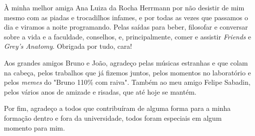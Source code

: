 À minha melhor amiga Ana Luiza da Rocha Herrmann por não desistir de mim mesmo com as piadas e trocadilhos infames, e por todas as vezes que passamos o dia e viramos a noite programando. Pelas saídas para beber, filosofar e conversar sobre a vida e a faculdade, conselhos, e, principalmente, comer e assistir \textit{Friends} e \textit{Grey's Anatomy}. Obrigada por tudo, cara!

Aos grandes amigos Bruno e João, agradeço pelas músicas estranhas e que colam na cabeça, pelos trabalhos que já fizemos juntos, pelos momentos no laboratório e pelos \textit{memes} do "Bruno 110\% com raiva". Também ao meu amigo Felipe Sabadin, pelos vários anos de amizade e risadas, que até hoje se mantém.

Por fim, agradeço a todos que contribuíram de alguma forma para a minha formação dentro e fora da universidade, todos foram especiais em algum momento para mim.


